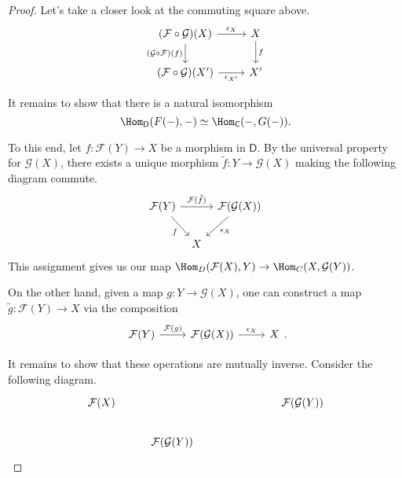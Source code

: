 \documentclass[notes.tex]{subfiles}
\begin{document}
\begin{proof}
  Let's take a closer look at the commuting square above.
  \begin{equation*}
    \begin{tikzcd}
      (\mathcal{F} \circ \mathcal{G})(X)
      \arrow[r, "\epsilon_{X}"]
      \arrow[d, swap, "(\mathcal{G} \circ \mathcal{F})(f)"]
      & X
      \arrow[d, "f"]
      \\
      (\mathcal{F} \circ \mathcal{G})(X')
      \arrow[r, swap, "\epsilon_{X'}"]
      & X'
    \end{tikzcd}
  \end{equation*}

  It remains to show that there is a natural isomorphism
  \begin{equation*}
    \Hom_{\mathsf{D}}(F(-), -) \simeq \Hom_{\mathsf{C}}(-, G(-)).
  \end{equation*}

  To this end, let $f\colon \mathcal{F}(Y) \to X$ be a morphism in $\mathsf{D}$. By the universal property for $\mathcal{G}(X)$, there exists a unique morphism $\tilde{f}\colon Y \to \mathcal{G}(X)$ making the following diagram commute.
  \begin{equation*}
    \begin{tikzcd}[column sep=tiny]
      \mathcal{F}(Y)
      \arrow[dr, swap, "f"]
      \arrow[rr, "\mathcal{F}(\tilde{f})"]
      && \mathcal{F}(\mathcal{G}(X))
      \arrow[dl, "\epsilon_{X}"]
      \\
      & X
    \end{tikzcd}
  \end{equation*}
  This assignment gives us our map $\Hom_{D}(\mathcal{F}(X), Y) \to \Hom_{C}(X, \mathcal{G}(Y))$.

  On the other hand, given a map $g\colon Y \to \mathcal{G}(X)$, one can construct a map $\tilde{g}\colon \mathcal{F}(Y) \to X$ via the composition
  \begin{equation*}
    \begin{tikzcd}
      \mathcal{F}(Y)
      \arrow[r, "\mathcal{F}(g)"]
      & \mathcal{F}(\mathcal{G}(X))
      \arrow[r, "\epsilon_{X}"]
      & X
    \end{tikzcd}.
  \end{equation*}

  It remains to show that these operations are mutually inverse. Consider the following diagram.
  \begin{equation*}
    \begin{tikzcd}
      \mathcal{F}(X)
      &&&& \mathcal{F}(\mathcal{G}(Y))
      \\
      & \mathcal{F}(\mathcal{G}(Y))
    \end{tikzcd}
  \end{equation*}
\end{proof}
\end{document}
